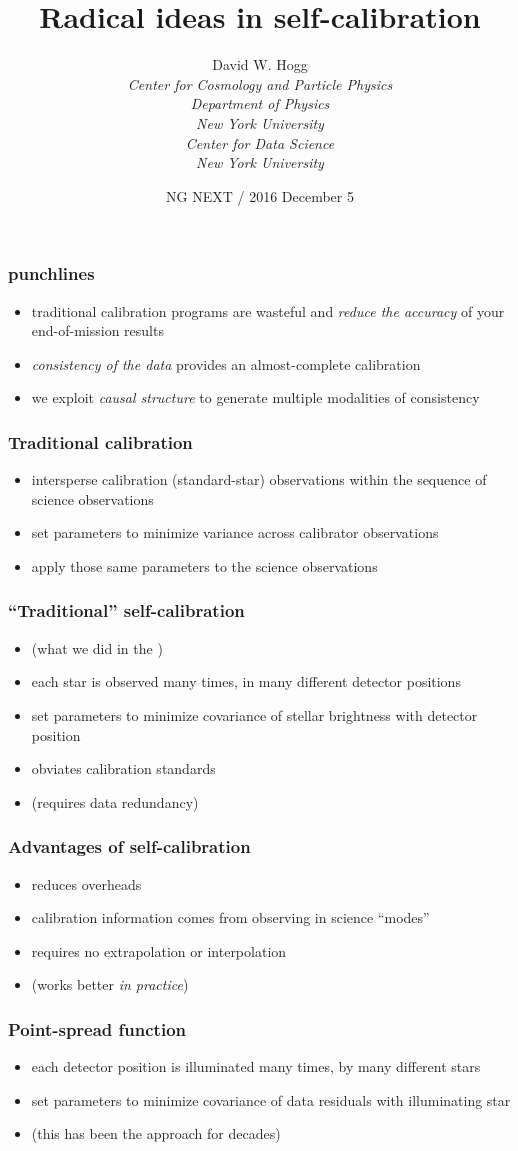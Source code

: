 \documentclass[pdftex]{beamer}
\title{Radical ideas in self-calibration}
\author[David W. Hogg (NYU)]{David W. Hogg \\[1ex]
  \textsl{\small Center for Cosmology and Particle Physics\\
                 Department of Physics\\
                 New York University\\[1ex]
                 Center for Data Science\\
                 New York University}}
\date{NG NEXT / 2016 December 5}
\newcommand{\conclusionslide}{
\begin{frame}
  \frametitle{punchlines}
  \begin{itemize}
  \item traditional calibration programs are wasteful and \emph{reduce the accuracy} of your end-of-mission results
  \item \emph{consistency of the data} provides an almost-complete calibration
  \item we exploit \emph{causal structure} to generate multiple modalities of consistency
  \end{itemize}
\end{frame}
}
\begin{document}
\begin{frame}
  \titlepage
\end{frame}

\conclusionslide

\begin{frame}
  \frametitle{Traditional calibration}
  \begin{itemize}
  \item intersperse calibration (standard-star) observations within the sequence of science observations
  \item set parameters to minimize variance across calibrator observations
  \item apply those same parameters to the science observations
  \end{itemize}
\end{frame}

\begin{frame}
  \frametitle{``Traditional'' self-calibration}
  \begin{itemize}
  \item (what we did in the )
  \item each star is observed many times, in many different detector positions
  \item set parameters to minimize covariance of stellar brightness with detector position
  \item obviates calibration standards
  \item (requires data redundancy)
  \end{itemize}
\end{frame}

\begin{frame}
  \frametitle{Advantages of self-calibration}
  \begin{itemize}
  \item reduces overheads
  \item calibration information comes from observing in science ``modes''
  \item requires no extrapolation or interpolation
  \item (works better \emph{in practice})
  \end{itemize}
\end{frame}

\begin{frame}
  \frametitle{Point-spread function}
  \begin{itemize}
  \item each detector position is illuminated many times, by many different stars
  \item set parameters to minimize covariance of data residuals with illuminating star
  \item (this has been the approach for decades)
  \end{itemize}
\end{frame}
\end{document}
